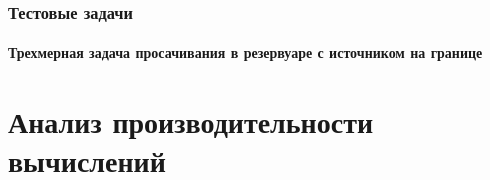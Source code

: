 \documentclass[10pt,pdf,hyperref={unicode}]{beamer} %
\begin{document}
\begin{frame}
\frametitle{Тестовые задачи}
\framesubtitle{Трехмерная задача просачивания в резервуаре с источником на границе}
\begin{center}
\begin{figure}
\end{figure}
  \end{center}
\end{frame}

\section{Анализ производительности вычислений}
\end{document}
